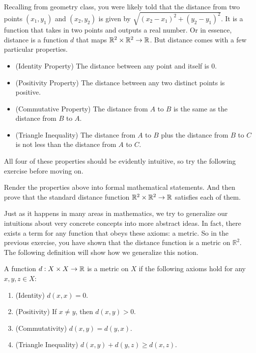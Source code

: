 Recalling from geometry class, you were likely told that the distance from two points $(x_1,y_1)$ and $(x_2,y_2)$ is given by $\sqrt{(x_2-x_1)^2+(y_2-y_1)^2}$. It is a function that takes in two points and outputs a real number. Or in essence, distance is a function $d$ that maps $\mathbb{R}^2\times\mathbb{R}^2\to\mathbb{R}$. But distance comes with a few particular properties. 

\begin{itemize}
    \item (Identity Property) The distance between any point and itself is $0$.
    \item (Positivity Property) The distance between any two distinct points is positive. 
    \item (Commutative Property) The distance from $A$ to $B$ is the same as the distance from $B$ to $A$.
    \item (Triangle Inequality) The distance from $A$ to $B$ plus the distance from $B$ to $C$ is not less than the distance from $A$ to $C$.
\end{itemize}

All four of these properties should be evidently intuitive, so try the following exercise before moving on.\\

\begin{exercise}
    Render the properties above into formal mathematical statements. And then prove that the standard distance function $\mathbb{R}^2\times\mathbb{R}^2\to\mathbb{R}$ satisfies each of them.
\end{exercise}

Just as it happens in many areas in mathematics, we try to generalize our intuitions about very concrete concepts into more abstract ideas. In fact, there exists a term for any function that obeys these axioms: a metric. So in the previous exercise, you have shown that the distance function is a metric on $\mathbb{R}^2$. The following definition will show how we generalize this notion.\\

\begin{definition}[A Metric on $X$]
    A function $d: X\times X \to \mathbb{R}$ is a metric on $X$ if the following axioms hold for any $x,y,z\in X$:
    \begin{enumerate}
        \item (Identity) $d(x,x)=0$. 
        \item (Positivity) If $x\neq y$, then $d(x,y)>0$. 
        \item (Commutativity) $d(x,y)=d(y,x)$. 
        \item (Triangle Inequality) $d(x,y)+d(y,z)\geq d(x,z)$. 
    \end{enumerate}
\end{definition}
\vspace{3mm}

